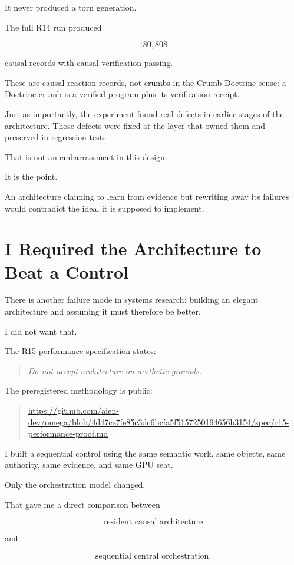 \documentclass[11pt]{article}
\begin{document}
It never produced a torn generation.

The full R14 run produced

\[
180{,}808
\]

causal records with causal verification passing.

These are causal reaction records, not crumbs in the Crumb Doctrine sense: a Doctrine crumb is a verified program plus its verification receipt.

Just as importantly, the experiment found real defects in earlier stages of the architecture. Those defects were fixed at the layer that owned them and preserved in regression tests.

That is not an embarrassment in this design.

It is the point.

An architecture claiming to learn from evidence but rewriting away its failures would contradict the ideal it is supposed to implement.

\section{I Required the Architecture to Beat a Control}

There is another failure mode in systems research: building an elegant architecture and assuming it must therefore be better.

I did not want that.

The R15 performance specification states:

\begin{quote}
\emph{Do not accept architecture on aesthetic grounds.}
\end{quote}

The preregistered methodology is public:

\begin{quote}
\url{https://github.com/aien-dev/omega/blob/4d47ce7fe85c3dc6bcfa5f5157250194656b3154/spec/r15-performance-proof.md}
\end{quote}

I built a sequential control using the same semantic work, same objects, same authority, same evidence, and same GPU seat.

Only the orchestration model changed.

That gave me a direct comparison between

\[
\text{resident causal architecture}
\]

and

\[
\text{sequential central orchestration}.
\]
\end{document}
